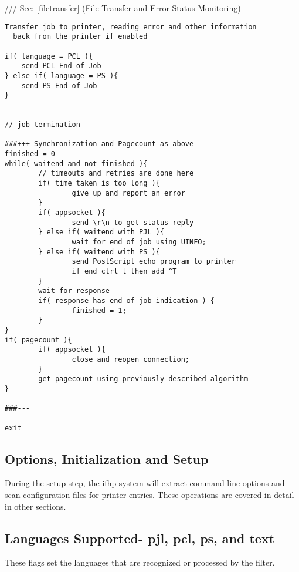 \documentclass[a4paper]{article}
\begin{document}
{\ttfamily ///} See: \ref{filetransfer} {(File Transfer and Error Status Monitoring)}
\begin{tscreen}
\begin{verbatim}
Transfer job to printer, reading error and other information
  back from the printer if enabled

if( language = PCL ){
    send PCL End of Job
} else if( language = PS ){
    send PS End of Job
}


// job termination

###+++ Synchronization and Pagecount as above
finished = 0
while( waitend and not finished ){
        // timeouts and retries are done here
        if( time taken is too long ){
                give up and report an error
        }
        if( appsocket ){
                send \r\n to get status reply
        } else if( waitend with PJL ){
                wait for end of job using UINFO;
        } else if( waitend with PS ){
                send PostScript echo program to printer
                if end_ctrl_t then add ^T
        }
        wait for response
        if( response has end of job indication ) {
                finished = 1;
        }
}
if( pagecount ){
        if( appsocket ){
                close and reopen connection;
        }
        get pagecount using previously described algorithm
}

###---

exit
\end{verbatim}
\end{tscreen}



\subsection{Options, Initialization and Setup
\label{setup}}

During the setup step,
the {\ttfamily ifhp} system will extract command line options
and scan configuration files for printer entries.
These operations are covered in detail in other sections.




\subsection{Languages Supported- pjl, pcl, ps, and text
\label{pjl}
\label{pcl}
\label{ps}
\label{text}}

These flags set the languages that are recognized or processed by
the filter.
\end{document}
